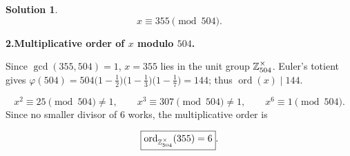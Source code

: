 \documentclass[12pt]{article}
\theoremstyle{definition} %
\newtheorem{solution}{Solution}
\theoremstyle{plain} %
\begin{document}
\begin{solution}
                    \[
                       \boxed{x\equiv355\pmod{504}}.
                    \]
                    
                    \bigskip
                    \textbf{2.\;Multiplicative order of \(x\) modulo \(504\).}
                    
                    Since \(\gcd(355,504)=1\), \(x=355\) lies in the unit group
                    \(\Bbb Z_{504}^{\times}\).
                    Euler’s totient gives
                    \(\varphi(504)=504\bigl(1-\tfrac12\bigr)\bigl(1-\tfrac13\bigr)
                                  \bigl(1-\tfrac17\bigr)=144\);
                    thus \(\operatorname{ord}(x)\mid144\).
                    
                    \[
                       x^{2}\equiv 25\pmod{504}\neq1,\qquad
                       x^{3}\equiv307\pmod{504}\neq1,\qquad
                       x^{6}\equiv1\pmod{504}.
                    \]
                    Since no smaller divisor of \(6\) works, the multiplicative order is
                    
                    \[
                       \boxed{\operatorname{ord}_{\Bbb Z_{504}^{\times}}(355)=6}.
                    \]
                    
                    \end{solution}
\end{document}
